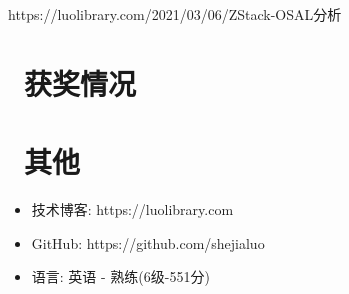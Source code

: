 \documentclass{resume}
\begin{document}
\begin{onehalfspacing}
https://luolibrary.com/2021/03/06/ZStack-OSAL分析
\end{onehalfspacing}

\section{\faHeartO\ 获奖情况}

\section{\faInfo\ 其他}
\begin{itemize}[parsep=0.5ex]
  \item 技术博客: https://luolibrary.com
  \item GitHub: https://github.com/shejialuo
  \item 语言: 英语 - 熟练(6级-551分)
\end{itemize}

%
%
\end{document}
